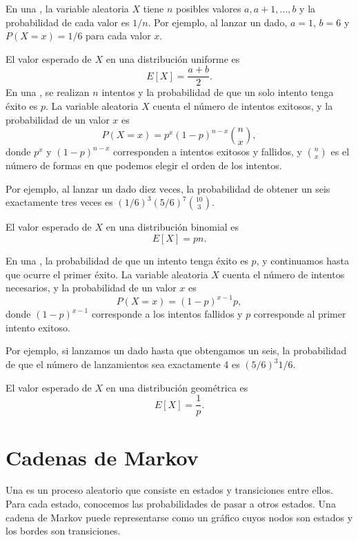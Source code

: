 En una ,
la variable aleatoria $X$ tiene $n$ posibles
valores $a,a+1,\ldots,b$ y la probabilidad de cada valor es $1/n$.
Por ejemplo, al lanzar un dado,
$a=1$, $b=6$ y $P(X=x)=1/6$ para cada valor $x$.

El valor esperado de $X$ en una distribución uniforme es
\[E[X] = \frac{a+b}{2}.\]
En una , se realizan $n$ intentos
y la probabilidad de que un solo intento tenga éxito
es $p$.
La variable aleatoria $X$ cuenta el número de
intentos exitosos,
y la probabilidad de un valor $x$ es
\[P(X=x)=p^x (1-p)^{n-x} {n \choose x},\]
donde $p^x$ y $(1-p)^{n-x}$ corresponden a
intentos exitosos y fallidos,
y ${n \choose x}$ es el número de formas
en que podemos elegir el orden de los intentos.

Por ejemplo, al lanzar un dado diez veces,
la probabilidad de obtener un seis exactamente
tres veces es $(1/6)^3 (5/6)^7 {10 \choose 3}$.

El valor esperado de $X$ en una distribución binomial es
\[E[X] = pn.\]

En una ,
la probabilidad de que un intento tenga éxito es $p$,
y continuamos hasta que ocurre el primer éxito.
La variable aleatoria $X$ cuenta el número
de intentos necesarios, y la probabilidad de
un valor $x$ es
\[P(X=x)=(1-p)^{x-1} p,\]
donde $(1-p)^{x-1}$ corresponde a los intentos fallidos
y $p$ corresponde al primer intento exitoso.

Por ejemplo, si lanzamos un dado hasta que obtengamos un seis,
la probabilidad de que el número de lanzamientos
sea exactamente 4 es $(5/6)^3 1/6$.

El valor esperado de $X$ en una distribución geométrica es
\[E[X]=\frac{1}{p}.\]

\section{Cadenas de Markov}


Una 
es un proceso aleatorio
que consiste en estados y transiciones entre ellos.
Para cada estado, conocemos las probabilidades
de pasar a otros estados.
Una cadena de Markov puede representarse como un gráfico
cuyos nodos son estados y los bordes son transiciones.

